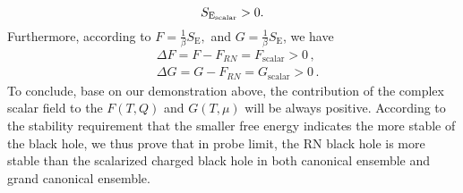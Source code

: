 \documentclass[pr, twocolumn, preprintnumbers, showpacs,footnoteadded, superscriptaddress,nofootinbib,longbibliography]{revtex4-1}
\begin{document}
%
\begin{equation}\label{frees1}
S_{\rm{E}_\text{scalar}}>0.
\end{equation}
%
Furthermore, according to $F=\frac{1}{\beta} S_{\text{E}},$ and $G=\frac{1}{\beta} S_{\text{E}}$, we have
%
\begin{eqnarray}
&\Delta F = F-F_{RN}=F_{\text{scalar}}>0 \, , \\
&\Delta G = G-F_{RN}=G_{\text{scalar}}>0\, .
\end{eqnarray}
%
To conclude, base on our demonstration above, the contribution of the complex scalar field to the $F(T, Q)$ and $G(T, \mu)$ will be always positive. According to the stability requirement that the smaller free energy indicates the more stable of the black hole, we thus  prove that in probe limit, the RN black hole is more stable than the scalarized charged black hole in both canonical ensemble and grand canonical ensemble.
\end{document}
